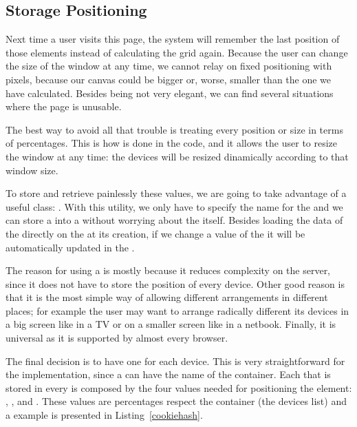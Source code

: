 
\subsection{Storage Positioning} %
\label{sub:storage}

Next time a user visits this page, the system will remember the last position of those elements instead of calculating the grid again.
Because the user can change the size of the window at any time, we cannot relay on fixed positioning with pixels, because our canvas could be bigger or, worse, smaller than the one we have calculated.
Besides being not very elegant, we can find several situations where the page is unusable.

The best way to avoid all that trouble is treating every position or size in terms of percentages.
This is how is done in the code, and it allows the user to resize the window at any time: the devices will be resized dinamically according to that window size.

To store and retrieve painlessly these values, we are going to take advantage of a useful  class:  \cite{MooHashCookie}.
With this utility, we only have to specify the name for the  and we can store a  into a  without worrying about the  itself.
Besides loading the data of the  directly on the  at its creation, if we change a value of the  it will be automatically updated in the .

The reason for using a  is mostly because it reduces complexity on the server, since it does not have to store the position of every device.
Other good reason is that it is the most simple way of allowing different arrangements in different places; for example the user may want to arrange radically different its devices in a big screen like in a TV or on a smaller screen like in a netbook.
Finally, it is universal as it is supported by almost every browser.

The final decision is to have one  for each device.
This is very straightforward for the implementation, since a  can
have the name of the container.
Each  that is stored in every  is composed by the four
values needed for positioning the element: , ,
 and .
These values are percentages respect the container (the devices list) and a
 example is presented in Listing~\vref{cookiehash}.

